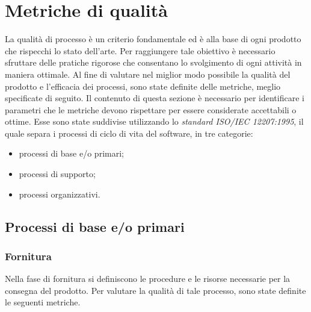 \section{Metriche di qualità}
La qualità di processo è un criterio fondamentale ed è alla base di ogni prodotto che rispecchi lo stato dell'arte. Per raggiungere tale obiettivo è necessario sfruttare delle pratiche rigorose che consentano lo svolgimento di ogni attività in maniera ottimale. Al fine di valutare nel miglior modo possibile la qualità del prodotto e l'efficacia dei processi, sono state definite delle metriche, meglio specificate di seguito. Il contenuto di questa sezione è necessario per identificare i parametri che le metriche devono rispettare per essere considerate accettabili o ottime. Esse sono state suddivise utilizzando lo \textit{standard ISO/IEC 12207:1995}, il quale separa i processi di ciclo di vita del software, in tre categorie: %
\begin{itemize}
	\item processi di base e/o primari;
	\item processi di supporto;
	\item processi organizzativi.
\end{itemize}

\subsection{Processi di base e/o primari}

\subsubsection{Fornitura}
Nella fase di fornitura si definiscono le procedure e le risorse necessarie per la consegna del prodotto. Per valutare la qualità di tale processo, sono state definite le seguenti metriche.

